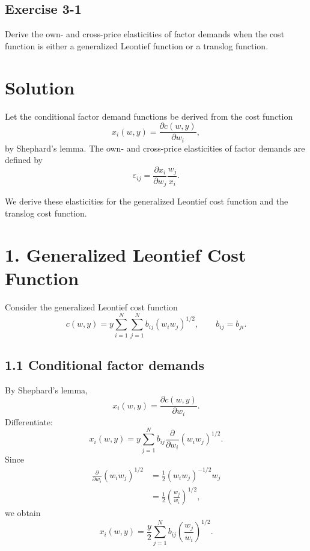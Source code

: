 \vspace{30pt}
\begin{tcolorbox}[breakable]

\subsection*{Exercise 3-1}

Derive the own- and cross-price elasticities of factor demands when the
cost function is either a generalized Leontief function or a translog function.

\end{tcolorbox}

\section*{Solution}

Let the conditional factor demand functions be derived from the cost function
\[
x_i(w,y)=\frac{\partial c(w,y)}{\partial w_i},
\]
by Shephard's lemma. The own- and cross-price elasticities of factor demands are defined by
\[
\varepsilon_{ij}
=
\frac{\partial x_i}{\partial w_j}\frac{w_j}{x_i}.
\]

We derive these elasticities for the generalized Leontief cost function and the translog cost function.

\bigskip
\section*{1. Generalized Leontief Cost Function}

Consider the generalized Leontief cost function
\[
c(w,y)
=
y\sum_{i=1}^N\sum_{j=1}^N b_{ij}(w_i w_j)^{1/2},
\qquad b_{ij}=b_{ji}.
\]

\subsection*{1.1 Conditional factor demands}

By Shephard's lemma,
\[
x_i(w,y)=\frac{\partial c(w,y)}{\partial w_i}.
\]
Differentiate:
\[
x_i(w,y)
=
y\sum_{j=1}^N b_{ij}\frac{\partial}{\partial w_i}(w_i w_j)^{1/2}.
\]
Since
\[
\begin{aligned}
\frac{\partial}{\partial w_i}(w_i w_j)^{1/2}
&=
\frac{1}{2}(w_i w_j)^{-1/2}w_j\\
&=
\frac{1}{2}\left(\frac{w_j}{w_i}\right)^{1/2},
\end{aligned}
\]
we obtain
\[
\boxed{
x_i(w,y)
=
\frac{y}{2}\sum_{j=1}^N b_{ij}\left(\frac{w_j}{w_i}\right)^{1/2}.
}
\]

